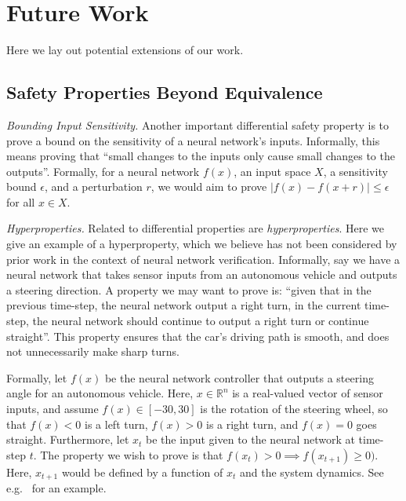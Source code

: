 \section{Future Work}
Here we lay out potential extensions of our work.

\subsection{Safety Properties Beyond Equivalence}
\textit{Bounding Input Sensitivity.} Another important differential safety
property is to prove a bound on the sensitivity of a neural network's
inputs. Informally, this means proving that ``small changes to the inputs
only cause small changes to the outputs''. Formally, for a neural network $
f(x) $, an input space $ X $, a sensitivity bound $ \epsilon $, and a
perturbation $ r $, we would aim to prove $ |f(x) - f(x + r)| \leq \epsilon
$ for all $ x \in X $.

\textit{Hyperproperties.} Related to differential properties are
\textit{hyperproperties}. Here we give an example of a hyperproperty, which
we believe has not been considered by prior work in the context of neural
network verification. Informally, say we have a neural network that takes sensor
inputs from an autonomous vehicle and outputs a steering direction. A
property we may want to prove is: ``given that in the previous
time-step, the neural network output a right turn, in the current
time-step, the neural network should continue to output a right turn or
continue straight''. This property ensures that the car's driving path is smooth, and
does not unnecessarily make sharp turns.


Formally, let $ f(x) $ be the neural network controller that outputs a
steering angle for an autonomous vehicle. Here, $ x \in \mathbb{R}^n $ is a
real-valued vector of sensor inputs, and assume $ f(x) \in [-30, 30] $ is
the rotation of the steering wheel, so that $ f(x) < 0 $ is a left turn, $
f(x) > 0 $ is a right turn, and $ f(x) = 0 $ goes straight. Furthermore,
let $ x_t $ be the input given to the neural network at time-step $ t $.
The property we wish to prove is that $ f(x_t) > 0 \implies f(x_{t+1}) \geq
0) $. Here, $ x_{t+1} $ would be defined by a function of $ x_t $ and the system
dynamics. See e.g.~\cite{hu2020reach} for an example.

